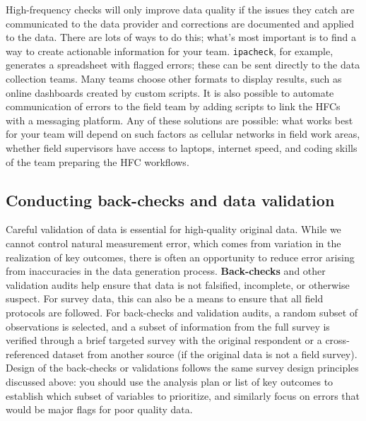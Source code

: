 High-frequency checks will only improve data quality
if the issues they catch are communicated to the data provider
and corrections are documented and applied to the data.
There are lots of ways to do this;
what's most important is to find a way to create actionable information for your team.
\texttt{ipacheck}, for example, generates a spreadsheet with flagged errors;
these can be sent directly to the data collection teams.
Many teams choose other formats to display results,
such as online dashboards created by custom scripts.
It is also possible to automate communication of errors to the field team
by adding scripts to link the HFCs with a messaging platform.
Any of these solutions are possible:
what works best for your team will depend on such factors as
cellular networks in field work areas, whether field supervisors have access to laptops,
internet speed, and coding skills of the team preparing the HFC workflows.

\subsection{Conducting back-checks and data validation}

Careful validation of data is essential for high-quality original data.
While we cannot control natural measurement error,
which comes from variation in the realization of key outcomes,
there is often an opportunity to reduce error arising from
inaccuracies in the data generation process.
\textbf{Back-checks} and other validation audits help ensure that
data is not falsified, incomplete, or otherwise suspect.
For survey data, this can also be a means to ensure that all field protocols are followed.
For back-checks and validation audits, a random subset of observations is selected,
and a subset of information from the full survey is
verified through a brief targeted survey with the original respondent
or a cross-referenced dataset from another source (if the original data is not a field survey).
Design of the back-checks or validations follows the same survey design
principles discussed above: you should use the analysis plan
or list of key outcomes to establish which subset of variables to prioritize,
and similarly focus on errors that would be major flags for poor quality data.

